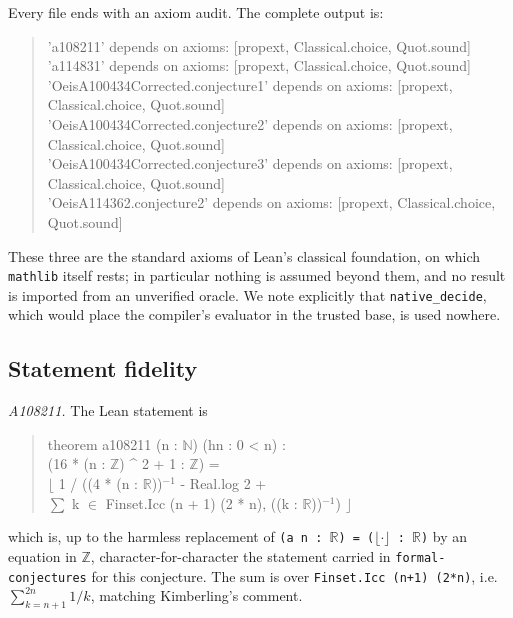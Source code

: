 \documentclass[11pt]{article}
\theoremstyle{plain}
\theoremstyle{definition}
\theoremstyle{remark}
\numberwithin{equation}{section}
\newcommand{\N}{\mathbb{N}}
\newcommand{\Z}{\mathbb{Z}}
\newcommand{\R}{\mathbb{R}}
\begin{document}
Every file ends with an axiom audit. The complete output is:
\begin{quote}\ttfamily\small
\begin{tabbing}
'a108211' depends on axioms: [propext, Classical.choice, Quot.sound]\\
'a114831' depends on axioms: [propext, Classical.choice, Quot.sound]\\
'OeisA100434Corrected.conjecture1' depends on axioms: [propext, Classical.choice, Quot.sound]\\
'OeisA100434Corrected.conjecture2' depends on axioms: [propext, Classical.choice, Quot.sound]\\
'OeisA100434Corrected.conjecture3' depends on axioms: [propext, Classical.choice, Quot.sound]\\
'OeisA114362.conjecture2' depends on axioms: [propext, Classical.choice, Quot.sound]
\end{tabbing}
\end{quote}
These three are the standard axioms of Lean's classical foundation, on which \texttt{mathlib}
itself rests; in particular nothing is assumed beyond them, and no result is imported from an
unverified oracle. We note explicitly that \texttt{native\_decide}, which would place the
compiler's evaluator in the trusted base, is used nowhere.

\subsection{Statement fidelity}

\emph{A108211.} The Lean statement is
\begin{quote}\ttfamily\small
theorem a108211 (n : $\N$) (hn : 0 < n) :\\
\hspace*{2em}(16 * (n : $\Z$) \textasciicircum{} 2 + 1 : $\Z$) =\\
\hspace*{4em}$\lfloor$ 1 / ((4 * (n : $\R$))$^{-1}$ - Real.log 2 +\\
\hspace*{6em}$\sum$ k $\in$ Finset.Icc (n + 1) (2 * n), ((k : $\R$))$^{-1}$) $\rfloor$
\end{quote}
which is, up to the harmless replacement of \texttt{(a n : $\R$) = ($\lfloor \cdot \rfloor$ : $\R$)}
by an equation in $\Z$, character-for-character the statement carried in
\texttt{formal-conjectures} for this conjecture. The sum is over
\texttt{Finset.Icc (n+1) (2*n)}, i.e. $\sum_{k=n+1}^{2n} 1/k$, matching Kimberling's comment.
\end{document}
